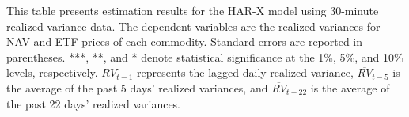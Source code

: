 \begin{landscape}
\begin{table}[htbp]
\begin{threeparttable}
\begin{tabular}{@{}lcccccccc@{}}
\bottomrule
\end{tabular}
\begin{tablenotes}
\small
\item This table presents estimation results for the HAR-X model using 30-minute realized variance data. The dependent variables are the realized variances for NAV and ETF prices of each commodity. Standard errors are reported in parentheses. ***, **, and * denote statistical significance at the 1\%, 5\%, and 10\% levels, respectively. $RV_{t-1}$ represents the lagged daily realized variance, $\overline{RV}_{t-5}$ is the average of the past 5 days' realized variances, and $\overline{RV}_{t-22}$ is the average of the past 22 days' realized variances.
\end{tablenotes}
\end{threeparttable}
\end{table}
\end{landscape}




